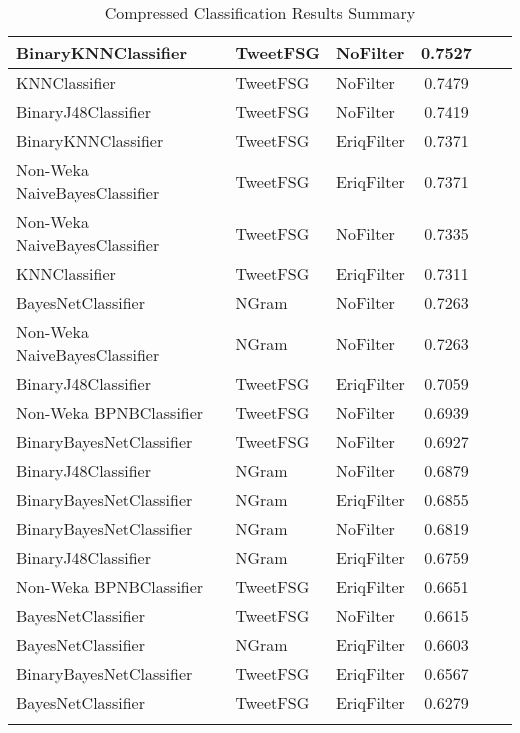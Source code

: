 \begin{center}
\begin{longtable}{|l|l|l|c|c|c|}
         BinaryKNNClassifier & TweetFSG & NoFilter & 0.7527
      \tabularnewline\hline
         KNNClassifier & TweetFSG & NoFilter & 0.7479
      \tabularnewline\hline
         BinaryJ48Classifier & TweetFSG & NoFilter & 0.7419
      \tabularnewline\hline
         BinaryKNNClassifier & TweetFSG & EriqFilter & 0.7371
      \tabularnewline\hline
         Non-Weka NaiveBayesClassifier & TweetFSG & EriqFilter & 0.7371
      \tabularnewline\hline
         Non-Weka NaiveBayesClassifier & TweetFSG & NoFilter & 0.7335
      \tabularnewline\hline
         KNNClassifier & TweetFSG & EriqFilter & 0.7311
      \tabularnewline\hline
         BayesNetClassifier & NGram & NoFilter & 0.7263
      \tabularnewline\hline
         Non-Weka NaiveBayesClassifier & NGram & NoFilter & 0.7263
      \tabularnewline\hline
         BinaryJ48Classifier & TweetFSG & EriqFilter & 0.7059
      \tabularnewline\hline
         Non-Weka BPNBClassifier & TweetFSG & NoFilter & 0.6939
      \tabularnewline\hline
         BinaryBayesNetClassifier & TweetFSG & NoFilter & 0.6927
      \tabularnewline\hline
         BinaryJ48Classifier & NGram & NoFilter & 0.6879
      \tabularnewline\hline
         BinaryBayesNetClassifier & NGram & EriqFilter & 0.6855
      \tabularnewline\hline
         BinaryBayesNetClassifier & NGram & NoFilter & 0.6819
      \tabularnewline\hline
         BinaryJ48Classifier & NGram & EriqFilter & 0.6759
      \tabularnewline\hline
         Non-Weka BPNBClassifier & TweetFSG & EriqFilter & 0.6651
      \tabularnewline\hline
         BayesNetClassifier & TweetFSG & NoFilter & 0.6615
      \tabularnewline\hline
         BayesNetClassifier & NGram & EriqFilter & 0.6603
      \tabularnewline\hline
         BinaryBayesNetClassifier & TweetFSG & EriqFilter & 0.6567
      \tabularnewline\hline
         BayesNetClassifier & TweetFSG & EriqFilter & 0.6279
      \tabularnewline\hline
      \caption[Compressed Classification Results Summary]{Compressed Classification Results Summary}
      \label{table:classification-summary-compressed}
   \end{longtable}
\end{center}


